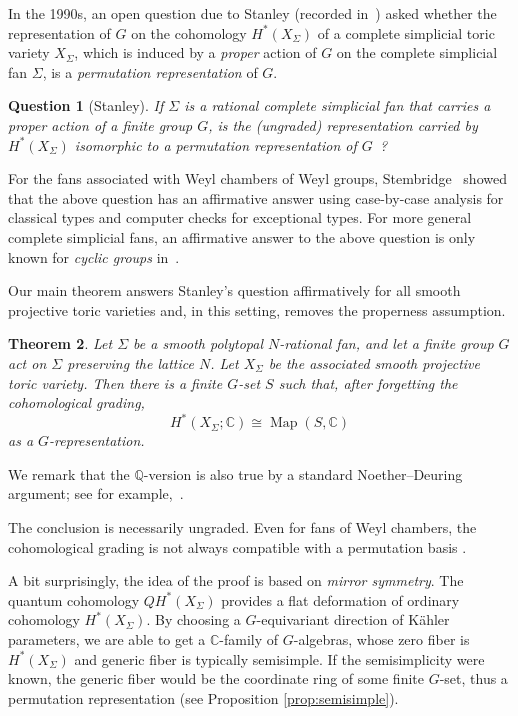 \documentclass[12pt]{amsart}
\newtheorem{theorem}{Theorem}[section]
\newtheorem{question}[theorem]{Question}
\theoremstyle{remark}
\begin{document}
In the 1990s, an open question due to Stanley (recorded in~\cite[Question 11.1]{Stembridge}) asked whether the representation of $G$ on the cohomology $H^{*}(X_{\Sigma})$ of a complete simplicial toric variety $X_{\Sigma}$, which is induced by a \emph{proper} action of $G$ on the complete simplicial fan $\Sigma$, is a \emph{permutation representation} of $G$. 

\begin{question}[Stanley] \label{ques-permu}
    If $\Sigma$ is a rational complete simplicial fan that carries a proper action of a finite group $G$, is the (ungraded) representation carried by $H^*(X_{\Sigma})$ isomorphic to a permutation representation of $G$~?
\end{question}

For the fans associated with Weyl chambers of Weyl groups, Stembridge~\cite{Stembridge} showed that the above question has an affirmative answer using case-by-case analysis for classical types and computer checks for exceptional types. For more general complete simplicial fans, 
an affirmative answer to the above question is only known for \emph{cyclic groups} in~\cite{Browder}.

Our main theorem answers Stanley’s question affirmatively for all smooth projective toric varieties and, in this setting, removes the properness assumption.

\begin{theorem}\label{thm:main}
Let \(\Sigma\) be a smooth polytopal $N$-rational fan, and let a finite group
\(G\) act on \(\Sigma\) preserving the lattice \(N\). Let $X_\Sigma$ be the associated smooth projective toric variety. Then there is a finite \(G\)-set \(S\)
such that, after forgetting the cohomological grading,
\[H^*(X_\Sigma;\mathbb{C})\cong\operatorname{Map}(S,\mathbb{C})\]
as a \(G\)-representation. 
\end{theorem}

We remark that the $\mathbb{Q}$-version is also true by a standard Noether--Deuring argument; see for example,~\cite[Theorem~(29.7)]{CurtisReiner}. 

The conclusion is necessarily ungraded. Even for fans of Weyl chambers, the
cohomological grading is not always compatible with a permutation basis
\cite{Stembridge}.

A bit surprisingly, the idea of the proof is based on \emph{mirror symmetry}. 
The quantum cohomology $QH^*(X_{\Sigma})$ provides a flat deformation of ordinary cohomology $H^*(X_\Sigma)$. By choosing a $G$-equivariant direction of K\"ahler parameters, we are able to get a $\mathbb{C}$-family of $G$-algebras, whose zero fiber is $H^*(X_\Sigma)$ and generic fiber is typically semisimple. 
If the semisimplicity were known, the generic fiber would be the coordinate ring of some finite $G$-set, thus a permutation representation (see Proposition \ref{prop:semisimple}). 
\end{document}
